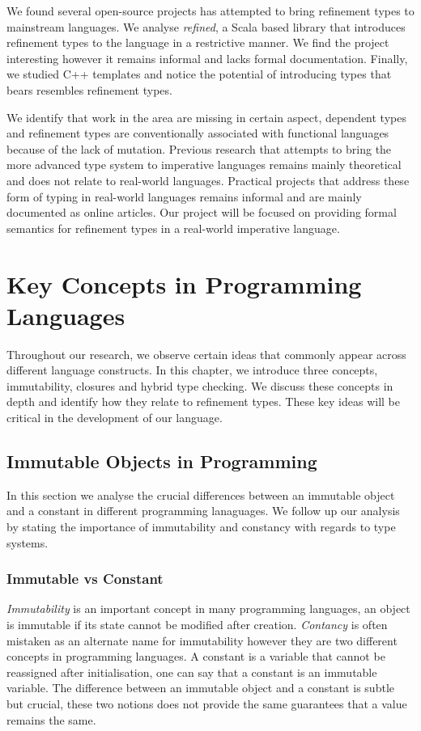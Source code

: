 \documentclass[a4paper,12pt]{report}
\begin{document}
\par
We found several open-source projects has attempted to bring refinement 
types to mainstream languages. We analyse \textit{refined}, a Scala based library that 
introduces refinement types to the language in a restrictive manner. We find the 
project interesting however it remains informal and lacks formal documentation. 
Finally, we studied C++ templates and notice the potential of introducing 
types that bears resembles refinement types.

\par
We identify that work in the area are missing in certain aspect, dependent types 
and refinement types are conventionally associated with functional languages 
because of the lack of mutation. Previous research that attempts to bring the more 
advanced type system to imperative languages remains mainly theoretical and 
does not relate to real-world languages. Practical projects that address 
these form of typing in real-world languages remains informal and are 
mainly documented as online articles. Our project will be focused on providing 
formal semantics for refinement types in a real-world imperative language. 

\chapter{Key Concepts in Programming Languages} \label{chapter:key_concepts}
Throughout our research, we observe certain ideas that commonly appear across 
different language constructs. In this chapter, we introduce three concepts, 
immutability, closures and hybrid type checking. We discuss these concepts 
in depth and identify how they relate to refinement types. These key ideas will 
be critical in the development of our language.

\section{Immutable Objects in Programming}
In this section we analyse the crucial differences between an immutable object   
and a constant in different programming lanaguages. We follow up our analysis by 
stating the importance of immutability and constancy with regards to type 
systems.

\subsection{Immutable vs Constant} \label{section:const_immutable}
\emph{Immutability} is an important concept in many programming languages, an 
object is immutable if its state cannot be modified after creation. 
\emph{Contancy} is often mistaken as an alternate name for 
immutability however they are two different concepts in programming languages. 
A constant is a variable that cannot be reassigned after initialisation, one can say 
that a constant is an immutable variable. 
The difference between an immutable object and a constant is subtle but crucial, 
these two notions does not provide the same guarantees that a value remains the 
same.
 
\end{document}
